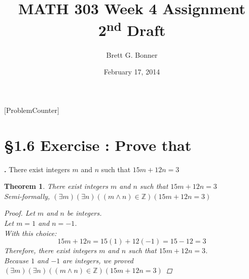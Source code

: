 \documentclass[a4paper,11pt]{article}
\begin{document}
\newtheorem*{theorem1}{Theorem}
\newtheorem*{theorem2}{Theorem}
\newtheorem*{theorem3}{Theorem}
\newtheorem*{theorem4}{Theorem}
\newtheorem*{theorem5}{Theorem}
\newtheorem*{theorem6}{Theorem}
\newtheorem*{theorem7}{Theorem}
\newtheorem*{theorem8}{Theorem}
\newtheorem*{disprove}{Disprove}
\title{MATH 303 Week 4 Assignment 2\textsuperscript{nd} Draft}
\author{Brett G. Bonner}
\date{February 17, 2014}
\maketitle
\linespread{1.5}
[ProblemCounter]
\addtocounter{ProblemCounter}{1} %
\addtocounter{SubsectionCounter}{2} %
%

\section*{\S 1.6 Exercise : Prove that}
\textbf{.}
There exist integers \(m\) and \(n\) such that \(15m+12n=3\)
\begin{theorem1}
There exist integers \(m\) and \(n\) such that \(15m+12n=3\)\\
Semi-formally, \((\exists m)(\exists n)((m \wedge n)\in \mathbb{Z})(15m+12n=3)\)
\begin{proof}
Let \(m\) and \(n\) be integers.\\
Let \(m=1\) and \(n=-1\).\\
With this choice:
\begin{equation*}
  15m+12n=
  15(1)+12(-1)=
  15-12=
  3
\end{equation*}
Therefore, there exist integers \(m\) and \(n\) such that \(15m+12n=3\).\\
Because \(1\) and \(-1\) are integers, we proved\\
\((\exists m)(\exists n)((m \wedge n)\in \mathbb{Z})(15m+12n=3)\)
\end{proof}
\end{theorem1}
\newpage

\addtocounter{SubsectionCounter}{2}
\end{document}

